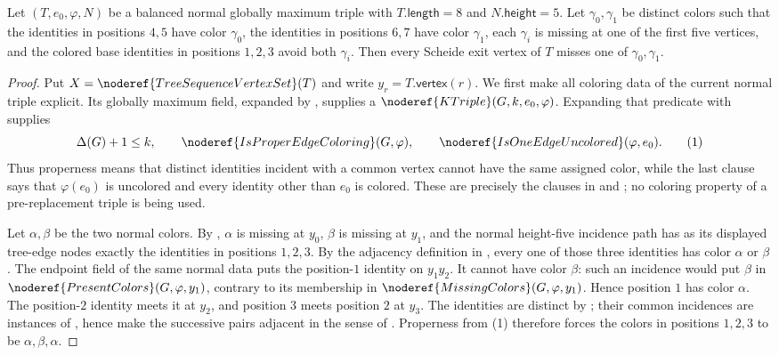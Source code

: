 \begin{helper}
Let $(T,e_0,\varphi,N)$ be a balanced normal globally maximum triple with
$T.\mathsf{length}=8$ and $N.\mathsf{height}=5$.  Let
$\gamma_0,\gamma_1$ be distinct colors such that the identities in
positions $4,5$ have color $\gamma_0$, the identities in positions $6,7$
have color $\gamma_1$, each $\gamma_i$ is missing at one of the first five
vertices, and the colored base identities in positions $1,2,3$ avoid both
$\gamma_i$.  Then every Scheide exit vertex of $T$ misses one of
$\gamma_0,\gamma_1$.
\end{helper}
\begin{proof}
Put $X=\noderef{TreeSequenceVertexSet}(T)$ and write
$y_r=T.\mathsf{vertex}(r)$.  We first make all coloring data of the
current normal triple explicit.  Its globally maximum field, expanded by
, supplies a
$\noderef{KTriple}(G,k,e_0,\varphi)$.  Expanding that predicate with
 supplies
\[
 \Delta(G)+1\leq k,\qquad
 \noderef{IsProperEdgeColoring}(G,\varphi),\qquad
 \noderef{IsOneEdgeUncolored}(\varphi,e_0).
\tag{1}
\]
Thus properness means that distinct identities incident with a common
vertex cannot have the same assigned color, while the last clause says
that $\varphi(e_0)$ is uncolored and every identity other than $e_0$ is
colored.  These are precisely the clauses in
 and ; no
coloring property of a pre-replacement triple is being used.

Let $\alpha,\beta$ be the two normal colors.  By
, $\alpha$ is missing at $y_0$,
$\beta$ is missing at $y_1$, and the normal height-five incidence path
has as its displayed tree-edge nodes exactly the identities in positions
$1,2,3$.  By the adjacency definition in
, every one of those three identities has
color $\alpha$ or $\beta$.  The endpoint field of the same normal data
puts the position-$1$ identity on $y_1y_2$.  It cannot have color
$\beta$: such an incidence would put $\beta$ in
$\noderef{PresentColors}(G,\varphi,y_1)$, contrary to its membership in
$\noderef{MissingColors}(G,\varphi,y_1)$.  Hence position $1$ has color
$\alpha$.  The position-$2$ identity meets it at $y_2$, and position $3$
meets position $2$ at $y_3$.  The identities are distinct by
; their common incidences are instances of
, hence make the successive pairs adjacent in the
sense of .  Properness from (1) therefore forces
the colors in positions $1,2,3$ to be $\alpha,\beta,\alpha$.


\end{proof}
